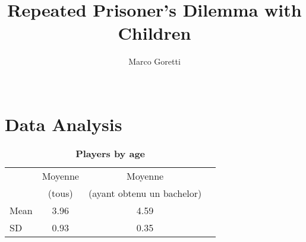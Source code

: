 \documentclass{article} %
\title{Repeated Prisoner's Dilemma with Children}
\author{
Marco Goretti \\
\texttt{} \\
}
\begin{document}
\maketitle


\section{Data Analysis}

\begin{table}[H]
\centering
\caption{\label{}\textbf{Players by age}}
\begin{tabular}{lccc}
   & Moyenne & Moyenne  \\
   & (tous) & (ayant obtenu un bachelor) \\ \hline
Mean   & 3.96   &     4.59       \\
SD &  0.93 & 0.35
\end{tabular}
\end{table}
\end{document}

